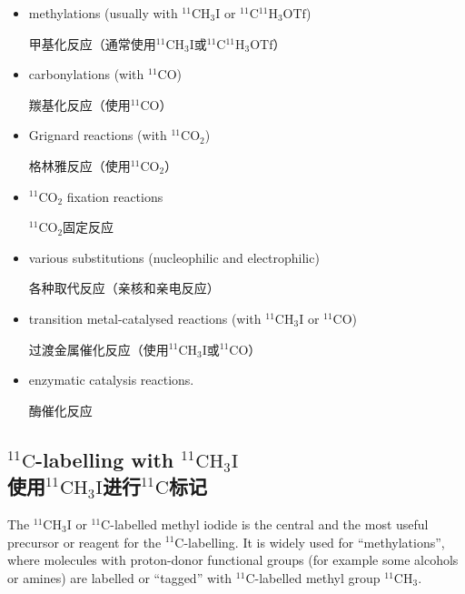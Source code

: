 \documentclass[dvipsnames, svgnames,a4paper,11pt]{article}
\begin{document}
\begin{itemize}
  \item methylations (usually with ${}^\mathrm{11}\mathrm{CH_3I}$ or ${}^\mathrm{11}\mathrm{C{}^{11}H_3OTf}$)

  甲基化反应（通常使用${}^\mathrm{11}\mathrm{CH_3I}$或${}^\mathrm{11}\mathrm{C{}^{11}H_3OTf}$）

  \item carbonylations (with ${}^\mathrm{11}\mathrm{C}$O)

  羰基化反应（使用${}^\mathrm{11}\mathrm{C}$O）

  \item Grignard reactions (with ${}^\mathrm{11}\mathrm{CO_2}$)

  格林雅反应（使用${}^\mathrm{11}\mathrm{CO_2}$）

  \item ${}^\mathrm{11}\mathrm{CO_2}$ fixation reactions

  ${}^\mathrm{11}\mathrm{CO_2}$固定反应

  \item various substitutions (nucleophilic and electrophilic)

  各种取代反应（亲核和亲电反应）

  \item transition metal-catalysed reactions (with ${}^\mathrm{11}\mathrm{CH_3I}$ or ${}^\mathrm{11}\mathrm{C}$O)

  过渡金属催化反应（使用${}^\mathrm{11}\mathrm{CH_3I}$或${}^\mathrm{11}\mathrm{C}$O）

  \item enzymatic catalysis reactions.

  酶催化反应
\end{itemize}

\subsection{${}^\mathrm{11}\mathrm{C}$-labelling with $\mathrm{{}^{11}CH_3I}$ \\使用$\mathrm{{}^{11}CH_3I}$进行${}^\mathrm{11}\mathrm{C}$标记}

The $\mathrm{{}^{11}CH_3I}$ or $\mathrm{{}^{11}C}$-labelled methyl iodide is the central and the most useful precursor or reagent for the ${}^\mathrm{11}\mathrm{C}$-labelling. It is widely used for “methylations”, where molecules with proton-donor functional groups (for example some alcohols or amines) are labelled or “tagged” with $\mathrm{{}^{11}C}$-labelled methyl group $\mathrm{{}^{11}CH_3}$.
\end{document}
